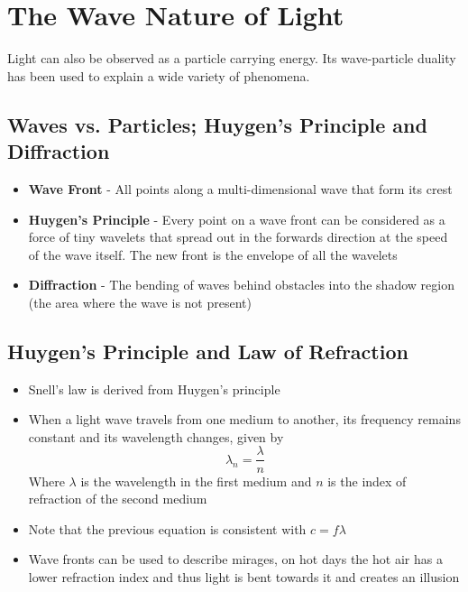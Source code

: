 \section{The Wave Nature of Light}
Light can also be observed as a particle carrying energy. Its wave-particle duality has been used to explain a wide variety of phenomena.

\subsection{Waves vs. Particles; Huygen's Principle and Diffraction}
\begin{itemize}
    \item \textbf{Wave Front} - All points along a multi-dimensional wave that form its crest
    \item \textbf{Huygen's Principle} - Every point on a wave front can be considered as a force of tiny wavelets that spread out in the forwards direction at the speed of the wave itself. The new front is the envelope of all the wavelets
    \item \textbf{Diffraction} - The bending of waves behind obstacles into the shadow region (the area where the wave is not present)
\end{itemize}

\subsection{Huygen's Principle and Law of Refraction}
\begin{itemize}
    \item Snell's law is derived from Huygen's principle
    \item When a light wave travels from one medium to another, its frequency remains constant and its wavelength changes, given by \[\lambda_n=\frac{\lambda}{n}\] Where \(\lambda\) is the wavelength in the first medium and \(n\) is the index of refraction of the second medium
    \item Note that the previous equation is consistent with \(c=f\lambda\)
    \item Wave fronts can be used to describe mirages, on hot days the hot air has a lower refraction index and thus light is bent towards it and creates an illusion
\end{itemize}

